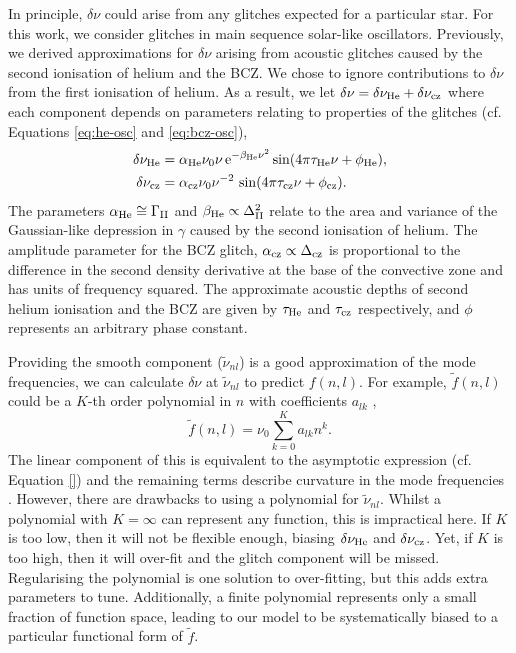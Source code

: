 In principle, \(\delta\nu\) could arise from any glitches expected for a particular star. For this work, we consider glitches in main sequence solar-like oscillators. Previously, we derived approximations for \(\delta\nu\) arising from acoustic glitches caused by the second ionisation of helium and the BCZ. We chose to ignore contributions to \(\delta\nu\) from the first ionisation of helium. As a result, we let \(\delta\nu = \delta\nu_{{\mathrm{He}}} + \delta\nu_{{\mathrm{cz}}}\) where each component depends on parameters relating to properties of the glitches (cf. Equations \ref{eq:he-osc} and \ref{eq:bcz-osc}),
%
\begin{align}
    \delta\nu_{{\mathrm{He}}} &= \alpha_{{\mathrm{He}}} \nu_0 \nu \, \mathrm{e}^{-\beta_{{\mathrm{He}}} \nu^2} \sin(4\pi\tau_{{\mathrm{He}}}\nu + \phi_{{\mathrm{He}}}), \label{eq:he-glitch}\\
    \delta\nu_{{\mathrm{cz}}} &= \alpha_{{\mathrm{cz}}} \nu_0 \nu^{-2} \, \sin(4\pi\tau_{{\mathrm{cz}}}\nu + \phi_{{\mathrm{cz}}}). \label{eq:bcz-glitch}
\end{align}
%
The parameters \(\alpha_{{\mathrm{He}}} \cong \Gamma_{{\mathrm{II}}}\) and \(\beta_{{\mathrm{He}}} \propto \Delta_{{\mathrm{II}}}^2\) relate to the area and variance of the Gaussian-like depression in \(\gamma\) caused by the second ionisation of helium. The amplitude parameter for the BCZ glitch, \(\alpha_{{\mathrm{cz}}} \propto \Delta_{{\mathrm{cz}}}\) is proportional to the difference in the second density derivative at the base of the convective zone and has units of frequency squared. The approximate acoustic depths of second helium ionisation and the BCZ are given by \(\tau_{{\mathrm{He}}}\) and \(\tau_{{\mathrm{cz}}}\) respectively, and \(\phi\) represents an arbitrary phase constant.

Providing the smooth component (\(\tilde{\nu}_{nl}\)) is a good approximation of the mode frequencies, we can calculate \(\delta\nu\) at \(\tilde{\nu}_{nl}\) to predict \(f(n, l)\). For example, \(\tilde{f}(n,l)\) could be a \(K\)-th order polynomial in \(n\) with coefficients \(a_{lk}\) \citep[e.g.][]{Kjeldsen.Bedding.ea2005,Ulrich1986},
%
\begin{equation}
    \tilde{f}(n, l) = \nu_0 \sum_{k=0}^{K} a_{lk} n^k. \label{eq:poly}
\end{equation}
%
The linear component of this is equivalent to the asymptotic expression (cf. Equation \ref{}) and the remaining terms describe curvature in the mode frequencies . However, there are drawbacks to using a polynomial for \(\tilde{\nu}_{nl}\). Whilst a polynomial with \(K = \infty\) can represent any function, this is impractical here. If \(K\) is too low, then it will not be flexible enough, biasing \(\delta\nu_{{\mathrm{He}}}\) and \(\delta\nu_{{\mathrm{cz}}}\). Yet, if \(K\) is too high, then it will over-fit and the glitch component will be missed. Regularising the polynomial is one solution to over-fitting, but this adds extra parameters to tune. Additionally, a finite polynomial represents only a small fraction of function space, leading to our model to be systematically biased to a particular functional form of \(\tilde{f}\).

